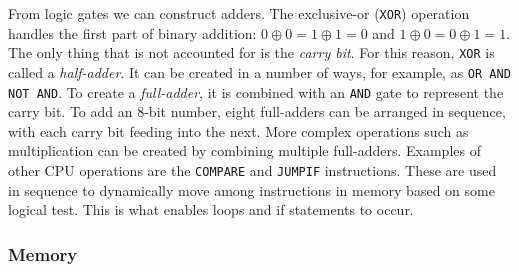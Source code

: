 \documentclass[11pt]{amsart}
\begin{document}
From logic gates we can construct adders. The exclusive-or (\texttt{XOR}) operation handles the first part of binary addition: $0 \oplus 0 = 1 \oplus 1 = 0$ and $1 \oplus 0 = 0 \oplus 1 = 1$. The only thing that is not accounted for is the \emph{carry bit}. For this reason, \texttt{XOR} is called a \emph{half-adder}. It can be created in a number of ways, for example, as \texttt{OR AND NOT AND}. To create a \emph{full-adder}, it is combined with an \texttt{AND} gate to represent the carry bit. To add an 8-bit number, eight full-adders can be arranged in sequence, with each carry bit feeding into the next. More complex operations such as multiplication can be created by combining multiple full-adders. Examples of other CPU operations are the \texttt{COMPARE} and \texttt{JUMPIF} instructions. These are used in sequence to dynamically move among instructions in memory based on some logical test. This is what enables loops and if statements to occur.

\subsubsection{Memory}
\end{document}
